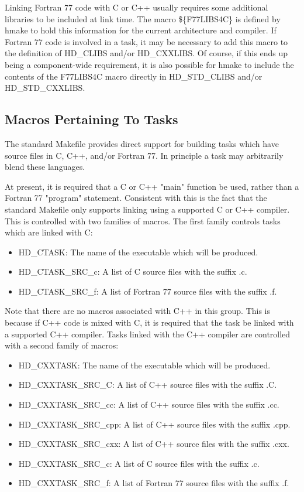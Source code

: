 \documentclass[11pt]{book}
\begin{document}
Linking Fortran 77 code with C or C++ usually requires some
additional libraries to be included at link time. The macro
\$\{F77LIBS4C\} is defined by hmake to hold this information
for the current architecture and compiler. If Fortran 77 code
is involved in a task, it may be necessary to add this macro
to the definition of HD\_CLIBS and/or HD\_CXXLIBS. Of course,
if this ends up being a component-wide requirement, it is also
possible for hmake to include the contents of the F77LIBS4C
macro directly in HD\_STD\_CLIBS and/or HD\_STD\_CXXLIBS.

\subsection{Macros Pertaining To Tasks}
The standard Makefile provides direct support for
building tasks which have source files in C, C++,
and/or Fortran 77. In principle a task may arbitrarily
blend these languages.

At present, it is required that a C or C++ "main" function
be used, rather than a Fortran 77 "program" statement.
Consistent with this is the fact that the standard Makefile
only supports linking using a supported C or C++ compiler.
This is controlled with two families of macros. The
first family controls tasks which are linked with C:

\begin{itemize}
\item HD\_CTASK: The name of the executable which
will be produced.
\item HD\_CTASK\_SRC\_c: A list of C source files with the
suffix .c.
\item HD\_CTASK\_SRC\_f: A list of Fortran 77 source files
with the suffix .f.
\end{itemize}

Note that there are no macros associated with C++ in this
group. This is because if C++ code is mixed with C, it is
required that the task be linked with a supported C++ compiler.
Tasks linked with the C++ compiler are controlled with
a second family of macros:

\begin{itemize}
\item HD\_CXXTASK: The name of the executable which
will be produced.
\item HD\_CXXTASK\_SRC\_C: A list of C++ source files with the
suffix .C.
\item HD\_CXXTASK\_SRC\_cc: A list of C++ source files with the
suffix .cc.
\item HD\_CXXTASK\_SRC\_cpp: A list of C++ source files with the
suffix .cpp.
\item HD\_CXXTASK\_SRC\_cxx: A list of C++ source files with the
suffix .cxx.
\item HD\_CXXTASK\_SRC\_c: A list of C source files with the
suffix .c.
\item HD\_CXXTASK\_SRC\_f: A list of Fortran 77 source files
with the suffix .f.
\end{itemize}
\end{document}
